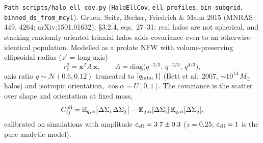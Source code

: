 \documentclass[a4paper, 11pt]{article}
\newcommand{\modname}[1]{\textcolor{kwcol}{\texttt{#1}}}
\newcommand{\pyfile}[1]{{\small\texttt{#1}}}
\begin{document}
\modname{Path}\ \pyfile{scripts/halo\_ell\_cov.py}
(\texttt{HaloEllCov}, \texttt{ell\_profiles},
\texttt{bin\_subgrid}, \texttt{binned\_ds\_from\_mcyl}). Gruen, Seitz,
Becker, Friedrich \& Mana 2015 (MNRAS 449, 4264; arXiv:1501.01632),
\S3.2.4, eqs.~27--31: real halos are not spherical, and stacking
randomly oriented triaxial halos adds covariance even to an
otherwise-identical population. Modelled as a prolate NFW with
volume-preserving ellipsoidal radius ($z'$ = long axis)
\begin{equation}
  r_e^2 = \mathbf{x}^T A\,\mathbf{x}, \qquad
  A = \mathrm{diag}\big(q^{-2/3},\,q^{-2/3},\,q^{4/3}\big),
\end{equation}
axis ratio $q\sim\mathcal N(0.6,0.12)$ truncated to $[q_{\rm min},1]$
(Bett et al.\ 2007, $\sim10^{14}\,M_\odot$ halos) and isotropic
orientation, $\cos\alpha\sim U[0,1]$. The covariance is the scatter
over shape and orientation at fixed mass,
\begin{equation}
  C^{\rm ell}_{ij} = \mathbb{E}_{q,\alpha}
    \big[\Delta\Sigma_i\,\Delta\Sigma_j\big]
    - \mathbb{E}_{q,\alpha}[\Delta\Sigma_i]\,\mathbb{E}_{q,\alpha}[\Delta\Sigma_j],
\end{equation}
calibrated on simulations with amplitude $c_{\rm ell}=3.7\pm0.3$
($z=0.25$; $c_{\rm ell}=1$ is the pure analytic model).
\end{document}
